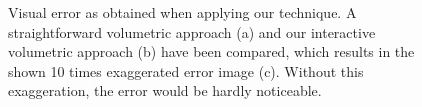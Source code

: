 \documentclass[journal]{vgtc}                %
\begin{document}
\begin{figure}
    \centering
    \caption{Visual error as obtained when applying our technique. A straightforward volumetric approach (a) and our interactive volumetric approach (b) have been compared, which results in the shown 10 times exaggerated error image (c). Without this exaggeration, the error would be hardly noticeable.}
    \label{fig:heart-analysis}
\end{figure}
\end{document}
